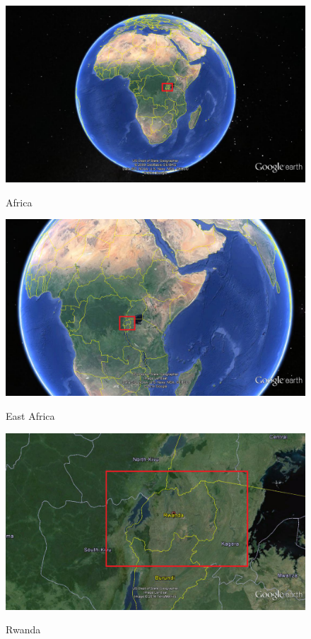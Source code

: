 \begin{figure}
\centering
\includegraphics[width=\columnwidth]{context/img/africa}
\label{fig:africa}
\caption{Africa}
\end{figure}

\begin{figure}
\centering
\includegraphics[width=\columnwidth]{context/img/eastAfrica}
\label{fig:east_africa}
\caption{East Africa}
\end{figure}

\begin{figure}
\centering
\includegraphics[width=\columnwidth]{context/img/rwanda}
\label{fig:rwanda}
\caption{Rwanda}
\end{figure}

